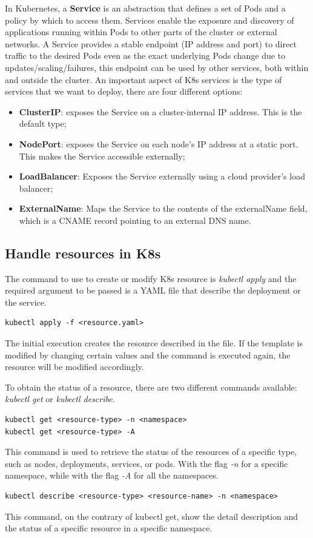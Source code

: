 In Kubernetes, a \textbf{Service} is an abstraction that defines a set of Pods and a policy by which to access them. Services enable the exposure and discovery of applications running within Pods to other parts of the cluster or external networks.
A Service provides a stable endpoint (IP address and port) to direct traffic to the desired Pods even as the exact underlying Pods change due to updates/scaling/failures, this endpoint can be used by other services, both within and outside the cluster. An important aspect of K8s services is the type of services that we want to deploy, there are four different options:
\begin{itemize}
   \item \textbf{ClusterIP}: exposes the Service on a cluster-internal IP address. This is the default type;
   \item \textbf{NodePort}: exposes the Service on each node's IP address at a static port. This makes the Service accessible externally;
   \item \textbf{LoadBalancer}: Exposes the Service externally using a cloud provider's load balancer;
   \item \textbf{ExternalName}: Maps the Service to the contents of the externalName field, which is a CNAME record pointing to an external DNS name.
\end{itemize}

\subsection{Handle resources in K8s}
The command to use to create or modify K8s resource is \textit{kubectl apply} and the required argument to be passed is a YAML file that describe the deployment or the service.
\begin{verbatim}
kubectl apply -f <resource.yaml>
\end{verbatim}
The initial execution creates the resource described in the file. If the template is modified by changing certain values and the command is executed again, the resource will be modified accordingly.

To obtain the status of a resource, there are two different commands available: \textit{kubectl get} or \textit{kubectl describe}.
\begin{verbatim}
kubectl get <resource-type> -n <namespace>
kubectl get <resource-type> -A
\end{verbatim}
This command is used to retrieve the status of the resources of a specific type, such as nodes, deployments, services, or pods. With the flag \emph{-n} for a specific namespace, while with the flag \emph{-A} for all the namespaces.
\begin{verbatim}
kubectl describe <resource-type> <resource-name> -n <namespace>
\end{verbatim}
This command, on the contrary of kubectl get, show the detail description and the status of a specific resource in a specific namespace.


